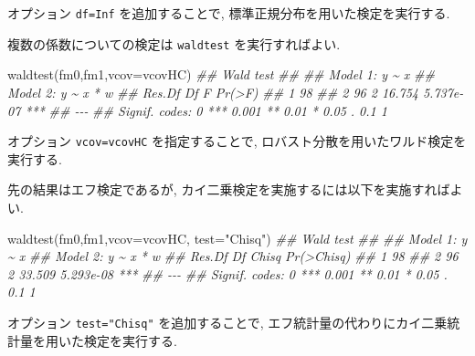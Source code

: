 \documentclass[
  letterpaper,
  xelatex,
  ja=standard, xelatex]{bxjsbook}
\newenvironment{Shaded}{\begin{snugshade}}{\end{snugshade}}
\newcommand{\AttributeTok}[1]{\textcolor[rgb]{0.40,0.45,0.13}{#1}}
\newcommand{\DocumentationTok}[1]{\textcolor[rgb]{0.37,0.37,0.37}{\textit{#1}}}
\newcommand{\FunctionTok}[1]{\textcolor[rgb]{0.28,0.35,0.67}{#1}}
\newcommand{\NormalTok}[1]{\textcolor[rgb]{0.00,0.23,0.31}{#1}}
\newcommand{\StringTok}[1]{\textcolor[rgb]{0.13,0.47,0.30}{#1}}
\begin{document}
オプション \texttt{df=Inf} を追加することで,
標準正規分布を用いた検定を実行する.

複数の係数についての検定は \texttt{waldtest} を実行すればよい.

\begin{Shaded}
\begin{Highlighting}[]
\FunctionTok{waldtest}\NormalTok{(fm0,fm1,}\AttributeTok{vcov=}\NormalTok{vcovHC)}
\DocumentationTok{\#\# Wald test}
\DocumentationTok{\#\# }
\DocumentationTok{\#\# Model 1: y \textasciitilde{} x}
\DocumentationTok{\#\# Model 2: y \textasciitilde{} x * w}
\DocumentationTok{\#\#   Res.Df Df      F    Pr(\textgreater{}F)    }
\DocumentationTok{\#\# 1     98                        }
\DocumentationTok{\#\# 2     96  2 16.754 5.737e{-}07 ***}
\DocumentationTok{\#\# {-}{-}{-}}
\DocumentationTok{\#\# Signif. codes:  0 \textquotesingle{}***\textquotesingle{} 0.001 \textquotesingle{}**\textquotesingle{} 0.01 \textquotesingle{}*\textquotesingle{} 0.05 \textquotesingle{}.\textquotesingle{} 0.1 \textquotesingle{} \textquotesingle{} 1}
\end{Highlighting}
\end{Shaded}

オプション \texttt{vcov=vcovHC} を指定することで,
ロバスト分散を用いたワルド検定を実行する.

先の結果はエフ検定であるが,
カイ二乗検定を実施するには以下を実施すればよい.

\begin{Shaded}
\begin{Highlighting}[]
\FunctionTok{waldtest}\NormalTok{(fm0,fm1,}\AttributeTok{vcov=}\NormalTok{vcovHC, }\AttributeTok{test=}\StringTok{"Chisq"}\NormalTok{)}
\DocumentationTok{\#\# Wald test}
\DocumentationTok{\#\# }
\DocumentationTok{\#\# Model 1: y \textasciitilde{} x}
\DocumentationTok{\#\# Model 2: y \textasciitilde{} x * w}
\DocumentationTok{\#\#   Res.Df Df  Chisq Pr(\textgreater{}Chisq)    }
\DocumentationTok{\#\# 1     98                         }
\DocumentationTok{\#\# 2     96  2 33.509  5.293e{-}08 ***}
\DocumentationTok{\#\# {-}{-}{-}}
\DocumentationTok{\#\# Signif. codes:  0 \textquotesingle{}***\textquotesingle{} 0.001 \textquotesingle{}**\textquotesingle{} 0.01 \textquotesingle{}*\textquotesingle{} 0.05 \textquotesingle{}.\textquotesingle{} 0.1 \textquotesingle{} \textquotesingle{} 1}
\end{Highlighting}
\end{Shaded}

オプション \texttt{test="Chisq"} を追加することで,
エフ統計量の代わりにカイ二乗統計量を用いた検定を実行する.
\end{document}

